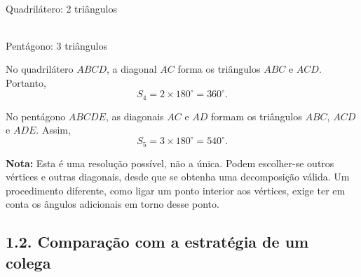 \begin{center}
\begin{minipage}{.47\linewidth}
\centering
{}\\[3pt]
{\small Quadrilátero: 2 triângulos}
\end{minipage}\hfill
\begin{minipage}{.47\linewidth}
\centering
{}\\[3pt]
{\small Pentágono: 3 triângulos}
\end{minipage}
\end{center}

No quadrilátero $ABCD$, a diagonal $AC$ forma os triângulos
$ABC$ e $ACD$. Portanto,
\[
S_4=2\times180^\circ=\boxed{360^\circ}.
\]

No pentágono $ABCDE$, as diagonais $AC$ e $AD$ formam os
triângulos $ABC$, $ACD$ e $ADE$. Assim,
\[
S_5=3\times180^\circ=\boxed{540^\circ}.
\]

\textbf{Nota:} Esta é uma resolução possível, não a única.
Podem escolher-se outros vértices e outras diagonais, desde que se
obtenha uma decomposição válida. Um procedimento diferente, como
ligar um ponto interior aos vértices, exige ter em conta os ângulos
adicionais em torno desse ponto.

\subsection*{1.2. Comparação com a estratégia de um colega}

